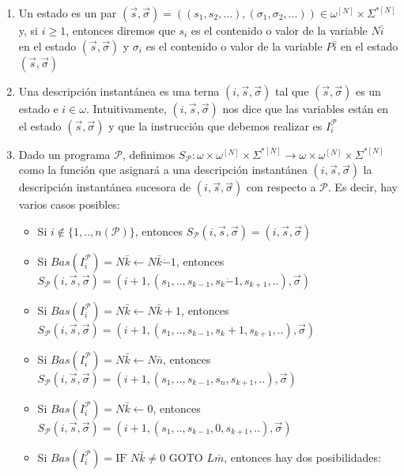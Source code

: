 \documentclass[
]{article}
\providecommand{\tightlist}{%
  \setlength{\itemsep}{0pt}\setlength{\parskip}{0pt}}
\begin{document}
\begin{enumerate}
\def\labelenumi{\arabic{enumi}.}
\tightlist
\item
  Un estado es un par
  \((\vec{s},\vec{\sigma})=((s_1,s_2,...),(\sigma_1,\sigma_2,...))\in\omega^{[N]}\times\Sigma^{*[N]}\)
  y, si \(i\geq 1\), entonces diremos que \(s_i\) es el contenido o
  valor de la variable \(N\bar{i}\) en el estado
  \((\vec{s},\vec{\sigma})\) y \(\sigma_i\) es el contenido o valor de
  la variable \(P\bar{i}\) en el estado \((\vec{s},\vec{\sigma})\)
\item
  Una descripción instantánea es una terna \((i,\vec{s},\vec{\sigma})\)
  tal que \((\vec{s},\vec{\sigma})\) es un estado e \(i\in\omega\).
  Intuitivamente, \((i,\vec{s},\vec{\sigma})\) nos dice que las
  variables están en el estado \((\vec{s},\vec{\sigma})\) y que la
  instrucción que debemos realizar es \(I_i^\mathcal{P}\)
\item
  Dado un programa \(\mathcal{P}\), definimos
  \(S_\mathcal{P}:\omega\times\omega^{[N]}\times\Sigma^{*[N]}\to\omega\times\omega^{[N]}\times\Sigma^{*[N]}\)
  como la función que asignará a una descripción instantánea
  \((i,\vec{s},\vec{\sigma})\) la descripción instantánea sucesora de
  \((i,\vec{s},\vec{\sigma})\) con respecto a \(\mathcal{P}\). Es decir,
  hay varios casos posibles:

  \begin{itemize}
  \tightlist
  \item
    Si \(i\notin\{1,..,n(\mathcal{P})\}\), entonces
    \(S_\mathcal{P}(i,\vec{s},\vec{\sigma})=(i,\vec{s},\vec{\sigma})\)
  \item
    Si \(Bas(I_i^\mathcal{P})=N\bar{k}\leftarrow N\bar{k}\dot{-}1\),
    entonces
    \(S_\mathcal{P}(i,\vec{s},\vec{\sigma})=(i+1,(s_1,..,s_{k-1},s_k\dot{-}1,s_{k+1},..),\vec{\sigma})\)
  \item
    Si \(Bas(I_i^\mathcal{P})=N\bar{k}\leftarrow N\bar{k}+1\), entonces
    \(S_\mathcal{P}(i,\vec{s},\vec{\sigma})=(i+1,(s_1,..,s_{k-1},s_k+1,s_{k+1},..),\vec{\sigma})\)
  \item
    Si \(Bas(I_i^\mathcal{P})=N\bar{k}\leftarrow N\bar{n}\), entonces
    \(S_\mathcal{P}(i,\vec{s},\vec{\sigma})=(i+1,(s_1,..,s_{k-1},s_n,s_{k+1},..),\vec{\sigma})\)
  \item
    Si \(Bas(I_i^\mathcal{P})=N\bar{k}\leftarrow 0\), entonces
    \(S_\mathcal{P}(i,\vec{s},\vec{\sigma})=(i+1,(s_1,..,s_{k-1},0,s_{k+1},..),\vec{\sigma})\)
  \item
    Si
    \(Bas(I_i^\mathcal{P})=\text{IF }N\bar{k}\neq 0\text{ GOTO }L\bar{m}\),
    entonces hay dos posibilidades:


\end{itemize}
\end{enumerate}
\end{document}
